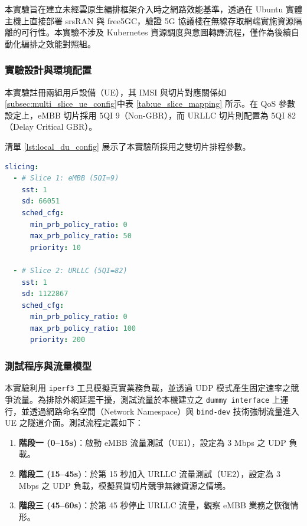 本實驗旨在建立未經雲原生編排框架介入時之網路效能基準，透過在 Ubuntu 實體主機上直接部署 srsRAN 與 free5GC，驗證 5G 協議棧在無線存取網端實施資源隔離的可行性。本實驗不涉及 Kubernetes 資源調度與意圖轉譯流程，僅作為後續自動化編排之效能對照組。

\subsubsection{實驗設計與環境配置}
本實驗註冊兩組用戶設備（UE），其 IMSI 與切片對應關係如\ref{subsec:multi_slice_ue_config}中表 \ref{tab:ue_slice_mapping} 所示。在 QoS 參數設定上，eMBB 切片採用 5QI 9（Non-GBR），而 URLLC 切片則配置為 5QI 82（Delay Critical GBR）。

清單 \ref{lst:local_du_config} 展示了本實驗所採用之雙切片排程參數。

\begin{lstlisting}[language=yaml, caption={實體機實驗之 DU 雙切片排程配置參數}, label={lst:local_du_config}]
slicing:
  - # Slice 1: eMBB (5QI=9)
    sst: 1
    sd: 66051
    sched_cfg:
      min_prb_policy_ratio: 0
      max_prb_policy_ratio: 50
      priority: 10

  - # Slice 2: URLLC (5QI=82)
    sst: 1
    sd: 1122867
    sched_cfg:
      min_prb_policy_ratio: 0
      max_prb_policy_ratio: 100
      priority: 200
\end{lstlisting}

\subsubsection{測試程序與流量模型}
本實驗利用 \texttt{iperf3} 工具模擬真實業務負載，並透過 UDP 模式產生固定速率之競爭流量。為排除外網延遲干擾，測試流量於本機建立之 \texttt{dummy interface} 上運行，並透過網路命名空間（Network Namespace）與 \texttt{bind-dev} 技術強制流量進入 UE 之隧道介面。測試流程定義如下：

\begin{enumerate}
    \item \textbf{階段一 (0--15s)}：啟動 eMBB 流量測試（UE1），設定為 3 Mbps 之 UDP 負載。
    \item \textbf{階段二 (15--45s)}：於第 15 秒加入 URLLC 流量測試（UE2），設定為 3 Mbps 之 UDP 負載，模擬異質切片競爭無線資源之情境。
    \item \textbf{階段三 (45--60s)}：於第 45 秒停止 URLLC 流量，觀察 eMBB 業務之恢復情形。
\end{enumerate}

